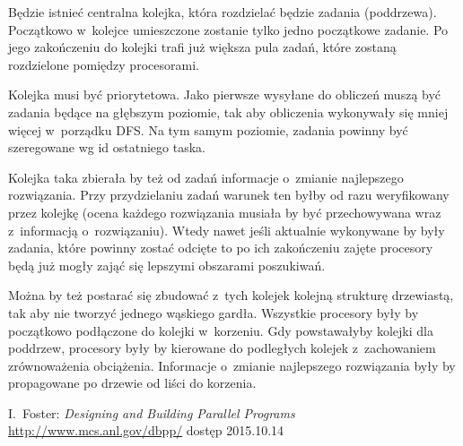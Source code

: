 \documentclass[a4paper; 12pt]{article}
\begin{document}
Będzie istnieć centralna kolejka, która rozdzielać będzie zadania (poddrzewa).
Początkowo w~kolejce umieszczone zostanie tylko jedno początkowe zadanie.
Po jego zakończeniu do kolejki trafi już większa pula zadań, które zostaną
rozdzielone pomiędzy procesorami.

Kolejka musi być priorytetowa.
Jako pierwsze wysyłane do obliczeń muszą być zadania będące na głębszym
poziomie, tak aby obliczenia wykonywały się mniej więcej w~porządku DFS.
Na tym samym poziomie, zadania powinny być szeregowane wg id ostatniego taska.

Kolejka taka zbierała by też od zadań informacje o~zmianie najlepszego
rozwiązania.
Przy przydzielaniu zadań warunek ten byłby od razu weryfikowany przez kolejkę
(ocena każdego rozwiązania musiała by być przechowywana wraz z~informacją
o~rozwiązaniu).
Wtedy nawet jeśli aktualnie wykonywane by były zadania, które powinny zostać
odcięte to po ich zakończeniu zajęte procesory będą już mogły zająć się
lepszymi obszarami poszukiwań.

Można by też postarać się zbudować z~tych kolejek kolejną strukturę drzewiastą,
tak aby nie tworzyć jednego wąskiego gardła.
Wszystkie procesory były by początkowo podłączone do kolejki w~korzeniu.
Gdy powstawałyby kolejki dla poddrzew, procesory były by kierowane do
podległych kolejek z~zachowaniem zrównoważenia obciążenia.
Informacje o~zmianie najlepszego rozwiązania były by propagowane po drzewie od
liści do korzenia.



\begin{thebibliography}{9}
        I.~Foster: \emph{Designing and Building Parallel Programs}
        \url{http://www.mcs.anl.gov/dbpp/} dostęp 2015.10.14
\end{thebibliography}
\end{document}
